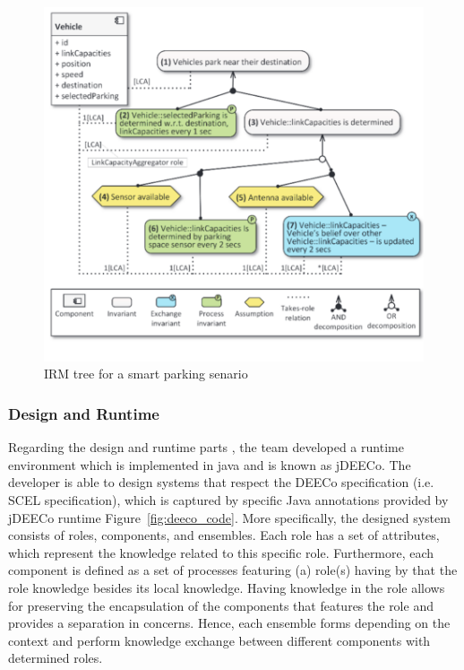 \begin{figure}[!htb]
\centering
\includegraphics[scale=0.40]{figures/irm}
\caption{IRM tree for a smart parking senario}
\label{fig:irm}
\end{figure}

\subsubsection{Design and Runtime}

Regarding the design and runtime parts \cite{Bures:2013:DEC:2465449.2465462}\cite{AlAli:2014:DEC:2591062.2591140} , the team developed a runtime environment which is implemented in java and is known as jDEECo. The developer is able to design systems that respect the DEECo specification (i.e. SCEL specification), which is captured by specific Java annotations provided by jDEECo runtime Figure~\ref{fig:deeco_code}. More specifically, the designed system consists of roles, components, and ensembles. Each role has a set of attributes, which represent the knowledge related to this specific role. Furthermore, each component is defined as a set of processes featuring (a) role(s) having by that the role knowledge besides its local knowledge. Having knowledge in the role allows for preserving the encapsulation of the components that features the role and provides a separation in concerns. Hence, each ensemble forms depending on the context and perform knowledge exchange between different components with determined roles. 


